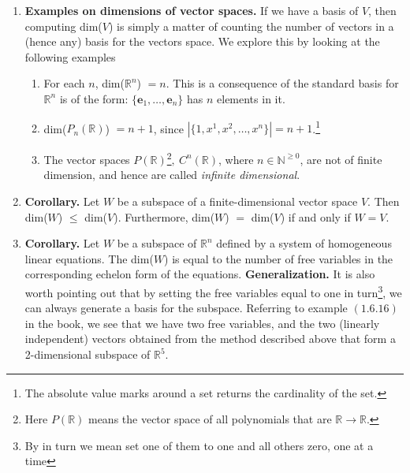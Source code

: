 \documentclass[oneside, 12pt]{book}
\newcommand{\settag}[1]{\renewcommand{\theenumi}{#1}}
\newcommand{\R}{\mathbb{R}}
\newcommand{\tbf}[1]{\textbf{#1}}
\newcommand{\tit}[1]{\textit{#1}}
\begin{document}
\begin{enumerate}
        \settag{1.6.13}
        \item \tbf{Examples on dimensions of vector spaces. }If we have a basis of $V$, then computing dim($V$) 
        is simply a matter of counting the number of vectors in a (hence any) basis for the vectors space. We 
        explore this by looking at the following examples
        \begin{enumerate}
            \item For each $n$, dim($\R^n$) $=n$. This is a consequence of the standard basis for $\R^n$ is of 
            the form: $\{\mathbf{e}_1, \ldots, \mathbf{e}_n\}$ has $n$ elements in it.
            \item dim($P_n(\R)$) $=n+1$, since $|\{1, x^1, x^2, \ldots, x^n\}|=n+1$.\footnote{The absolute value 
            marks around a set returns the cardinality of the set.}
            \item The vector spaces $P(\R)$\footnote{Here $P(\R)$ means the vector space of all polynomials that 
            are $\R \xrightarrow{} \R$.}$,~C^n(\R)$, where $n\in \mathbb{N}^{\geq 0}$, are not of finite dimension,
             and hence are called \tit{infinite dimensional}.
        \end{enumerate}
        
        \settag{1.6.14}
        \item \tbf{Corollary. }Let $W$ be a subspace of a finite-dimensional vector space $V$. Then dim($W$)
         $\leq$ dim($V$). Furthermore, dim($W$) $=$ dim($V$) if and only if $W=V$.
        
        \settag{1.6.15}
        \item \tbf{Corollary. }Let $W$ be a subspace of $\R^n$ defined by a system of homogeneous linear 
        equations. The dim($W$) is equal to the number of free variables in the corresponding echelon form 
        of the equations.\newline
        \tbf{Generalization.} It is also worth pointing out that by setting the free variables equal to one
         in turn\footnote{By in turn we mean set one of them to one and all others zero, one at a time}, we 
         can always generate a basis for the subspace. Referring to example $(1.6.16)$ in the book, we see that 
         we have two free variables, and the two (linearly independent) vectors obtained from the method described 
         above that form a 2-dimensional subspace of $\R^5$. 
        

\end{enumerate}
\end{document}
